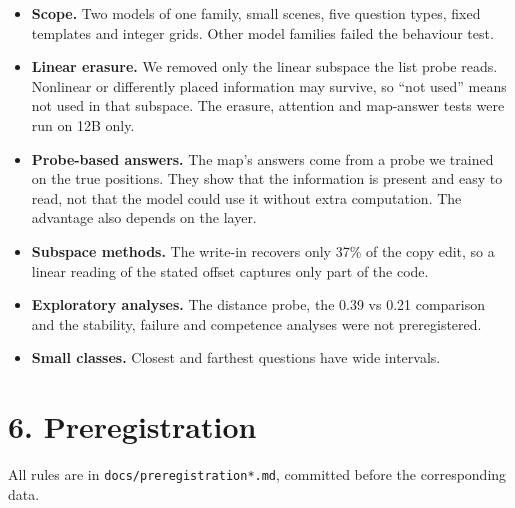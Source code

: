 \documentclass[
  11pt,
]{article}
\providecommand{\tightlist}{%
  \setlength{\itemsep}{0pt}\setlength{\parskip}{0pt}}
\begin{document}
\begin{itemize}
\tightlist
\item
  \textbf{Scope.} Two models of one family, small scenes, five question
  types, fixed templates and integer grids. Other model families failed
  the behaviour test.
\item
  \textbf{Linear erasure.} We removed only the linear subspace the list
  probe reads. Nonlinear or differently placed information may survive,
  so ``not used'' means not used in that subspace. The erasure,
  attention and map-answer tests were run on 12B only.
\item
  \textbf{Probe-based answers.} The map's answers come from a probe we
  trained on the true positions. They show that the information is
  present and easy to read, not that the model could use it without
  extra computation. The advantage also depends on the layer.
\item
  \textbf{Subspace methods.} The write-in recovers only 37\% of the copy
  edit, so a linear reading of the stated offset captures only part of
  the code.
\item
  \textbf{Exploratory analyses.} The distance probe, the 0.39 vs 0.21
  comparison and the stability, failure and competence analyses were not
  preregistered.
\item
  \textbf{Small classes.} Closest and farthest questions have wide
  intervals.
\end{itemize}

\section{6. Preregistration}\label{preregistration}

All rules are in \texttt{docs/preregistration*.md}, committed before the
corresponding data.
\end{document}
